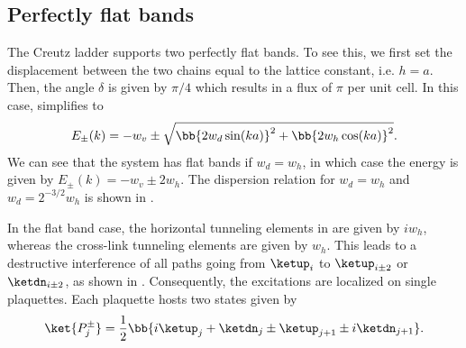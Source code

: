 \subsection{Perfectly flat bands}
The Creutz ladder supports two perfectly flat bands. To see this, we first set the displacement between the two chains equal to the lattice constant, i.e. $h=a$.
Then, the angle $\delta$ is given by $\pi/4$ which results in a flux of $\pi$ per unit cell.
In this case,  simplifies to
\begin{align}
    E_\pm(k) = -w_v \pm \sqrt{ \bb{ 2w_d\sin(ka) }^2 + \bb{ 2w_h\cos(ka) }^2 }.
\end{align}
We can see that the system has flat bands if $w_d = w_h$, in which case the energy is given by $E_\pm(k) = -w_v \pm 2 w_h$.
The dispersion relation for $w_d=w_h$ and $w_d = 2^{-3/2} w_h$ is shown in .

In the flat band case, the horizontal tunneling elements in  are given by $i w_h$, whereas the cross-link tunneling elements are given by $w_h$.
This leads to a destructive interference of all paths going from $\ketup_i$ to $\ketup_{i \pm 2}$ or $\ketdn_{i\pm 2}$, as shown in .
Consequently, the excitations are localized on single plaquettes. Each plaquette hosts two states given by
\begin{align}
    \ket{P_j^\pm} = \frac{1}{2} \bb{ i \ketup_j + \ketdn_j \pm \ketup_{j+1} \pm i \ketdn_{j+1} }.
\end{align}



